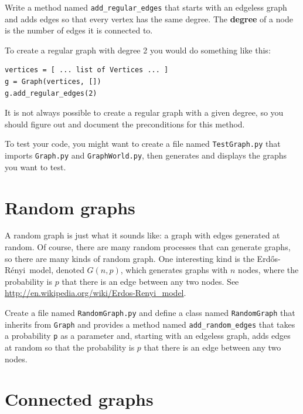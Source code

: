 \documentclass[10pt]{book}
\begin{document}
\begin{ex}

Write a method named \verb"add_regular_edges" that starts with an
edgeless graph and adds edges so that every vertex has the same
degree.  The {\bf degree} of a node is the number of edges it is
connected to.

To create a regular graph with degree 2 you would do something
like this:

\begin{verbatim}
vertices = [ ... list of Vertices ... ]
g = Graph(vertices, [])
g.add_regular_edges(2)
\end{verbatim} 

It is not always possible to create a regular graph
with a given degree, so you should figure out and document the
preconditions for this method.

To test your code, you might want to create a file named
{\tt TestGraph.py} that imports {\tt Graph.py} and
{\tt GraphWorld.py}, then generates and displays the graphs
you want to test.

\end{ex}


\newcommand{\Erdos}{Erd\H{o}s}
\newcommand{\Renyi}{R\'{e}nyi}

\section{Random graphs}

A random graph is just what it sounds like: a graph with edges
generated at random.  Of course, there are many random processes that
can generate graphs, so there are many kinds of random graph.  One
interesting kind is the \Erdos-\Renyi~model, denoted $G(n,p)$, which
generates graphs with $n$ nodes, where the probability is $p$ that
there is an edge between any two nodes.  See
\url{http://en.wikipedia.org/wiki/Erdos-Renyi_model}.

\begin{ex}

Create a file named {\tt RandomGraph.py} and define a class named 
{\tt RandomGraph} that inherits from {\tt Graph} and provides a method
named \verb"add_random_edges" that takes a probability {\tt p} as a
parameter and, starting with an edgeless graph, adds edges at random
so that the probability is $p$ that there is an edge between any two
nodes.

\end{ex}


\section{Connected graphs}
\label{bfs}
\end{document}
